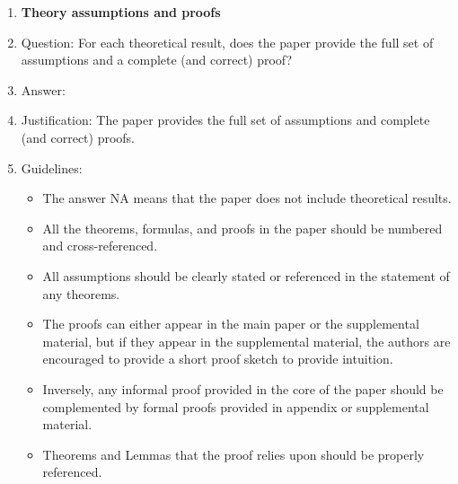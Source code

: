 \documentclass{article}
\numberwithin{equation}{section}
\theoremstyle{definition}
\begin{document}
\begin{enumerate}
\item {\bf Theory assumptions and proofs}
    \item[] Question: For each theoretical result, does the paper provide the full set of assumptions and a complete (and correct) proof?
    \item[] Answer: \answerYes{} %
    \item[] Justification: The paper provides the full set of assumptions and complete (and correct) proofs.
    \item[] Guidelines:
    \begin{itemize}
        \item The answer NA means that the paper does not include theoretical results. 
        \item All the theorems, formulas, and proofs in the paper should be numbered and cross-referenced.
        \item All assumptions should be clearly stated or referenced in the statement of any theorems.
        \item The proofs can either appear in the main paper or the supplemental material, but if they appear in the supplemental material, the authors are encouraged to provide a short proof sketch to provide intuition. 
        \item Inversely, any informal proof provided in the core of the paper should be complemented by formal proofs provided in appendix or supplemental material.
        \item Theorems and Lemmas that the proof relies upon should be properly referenced. 
    \end{itemize}


\end{enumerate}
\end{document}
